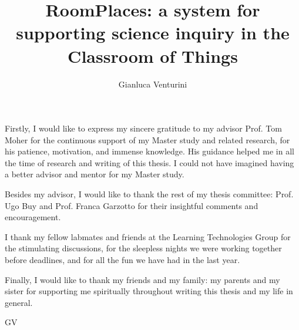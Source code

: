 \documentclass{uicthesi}
\begin{document}

\title{RoomPlaces: a system for supporting science inquiry in the Classroom of Things}
\author{Gianluca Venturini}
\maketitle


\acknowledgements
{Firstly, I would like to express my sincere gratitude to my advisor Prof. Tom Moher for the continuous support of my Master study and related research, for his patience, motivation, and immense knowledge. His guidance helped me in all the time of research and writing of this thesis. I could not have imagined having a better advisor and mentor for my Master study.

Besides my advisor, I would like to thank the rest of my thesis committee: Prof. Ugo Buy and Prof. Franca Garzotto for their insightful comments and encouragement.

I thank my fellow labmates and friends at the Learning Technologies Group for the stimulating discussions, for the sleepless nights we were working together before deadlines, and for all the fun we have had in the last year.

Finally, I would like to thank my friends and my family: my parents and my sister for supporting me spiritually throughout writing this thesis and my life in general.

\begin{flushright}
GV %
\end{flushright}}
\end{document}
